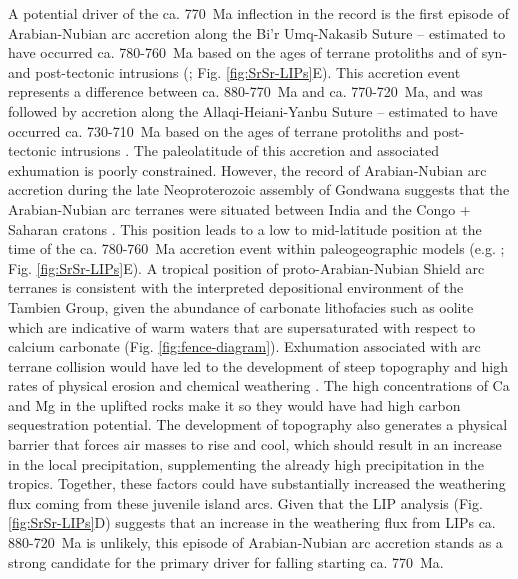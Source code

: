 A potential driver of the ca. 770~Ma inflection in the \SrSr record is the first episode of Arabian-Nubian arc accretion along the Bi'r Umq-Nakasib Suture -- estimated to have occurred ca. 780-760~Ma based on the ages of terrane protoliths and of syn- and post-tectonic intrusions (\citealp{Pallister1988a, Johnson2003a, Johnson2003b, Johnson2014a}; Fig. \ref{fig:SrSr-LIPs}E). This accretion event represents a difference between ca. 880-770~Ma and ca. 770-720~Ma, and was followed by accretion along the Allaqi-Heiani-Yanbu Suture -- estimated to have occurred ca. 730-710~Ma based on the ages of terrane protoliths and post-tectonic intrusions \citep{Ali2010a, Johnson2014a, Kozdroj2017a}. The paleolatitude of this accretion and associated exhumation is poorly constrained. However, the record of Arabian-Nubian arc accretion during the late Neoproterozoic assembly of Gondwana suggests that the Arabian-Nubian arc terranes were situated between India and the Congo + Saharan cratons \citep{Li2008a, Hoffman2009a, Merdith2017a}. This position leads to a low to mid-latitude position at the time of the ca. 780-760~Ma accretion event within paleogeographic models (e.g. \citealp{Li2008a,  Merdith2017a}; Fig. \ref{fig:SrSr-LIPs}E). A tropical position of proto-Arabian-Nubian Shield arc terranes is consistent with the interpreted depositional environment of the Tambien Group, given the abundance of carbonate lithofacies such as oolite which are indicative of warm waters that are supersaturated with respect to calcium carbonate (Fig. \ref{fig:fence-diagram}). Exhumation associated with arc terrane collision would have led to the development of steep topography and high rates of physical erosion and chemical weathering \citep{Gabet2009a}. The high concentrations of Ca and Mg in the uplifted rocks make it so they would have had high carbon sequestration potential. The development of topography also generates a physical barrier that forces air masses to rise and cool, which should result in an increase in the local precipitation, supplementing the already high precipitation in the tropics. Together, these factors could have substantially increased the weathering flux coming from these juvenile island arcs. Given that the LIP analysis (Fig. \ref{fig:SrSr-LIPs}D) suggests that an increase in the weathering flux from LIPs ca. 880-720~Ma is unlikely, this episode of Arabian-Nubian arc accretion stands as a strong candidate for the primary driver for falling \SrSr starting ca. 770~Ma.

